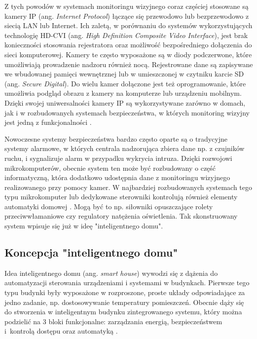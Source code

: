 \documentclass[a4paper,11pt,twoside]{article}
\begin{document}
Z tych powodów w systemach monitoringu wizyjnego coraz częściej stosowane są kamery IP (ang. \textit{Internet Protocol}) łączące się przewodowo lub bezprzewodowo z siecią LAN lub Internet. Ich zaletą, w porównaniu do systemów wykorzystujących technologię HD-CVI (ang. \textit{High Definition Composite Video Interface}), jest brak konieczności stosowania rejestratora oraz możliwość bezpośredniego dołączenia do sieci komputerowej. Kamery te często wyposażone są w diody podczerwone, które umożliwiają prowadzenie nadzoru również nocą. Rejestrowane dane są zapisywane we wbudowanej pamięci wewnętrznej lub w umieszczonej w czytniku karcie SD (ang. \textit{Secure Digital}). Do wielu kamer dołączone jest też oprogramowanie, które umożliwia podgląd obrazu z kamery na komputerze lub urządzeniu mobilnym. Dzięki swojej uniwersalności kamery IP są wykorzystywane zarówno w domach, jak i w rozbudowanych systemach bezpieczeństwa, w których monitoring wizyjny jest jedną z funkcjonalności \cite{komputer_świat}\cite{kamery-ip}.

Nowoczesne systemy bezpieczeństwa bardzo często oparte są o tradycyjne systemy alarmowe, w których centrala nadzorująca zbiera dane np. z czujników ruchu, i sygnalizuje alarm w przypadku wykrycia intruza. Dzięki rozwojowi mikrokomputerów, obecnie system ten może być rozbudowany o część informatyczną, która dodatkowo udostępnia dane z monitoringu wizyjnego realizowanego przy pomocy kamer. W najbardziej rozbudowanych systemach tego typu mikrokomputer lub dedykowane sterowniki kontrolują również elementy automatyki domowej \cite{monitoring}. Mogą być to np. siłowniki opuszczające rolety przeciwwłamaniowe czy regulatory natężenia oświetlenia. Tak skonstruowany system wpisuje się już w ideę "inteligentnego domu".

\subsection{Koncepcja "inteligentnego domu"}
Idea inteligentnego domu (ang. \textit{smart house}) wywodzi się z dążenia do automatyzacji sterowania urządzeniami i systemami w budynkach. Pierwsze tego typu budynki były wyposażone w rozproszone, proste układy odpowiadające za jedno zadanie, np. dostosowywanie temperatury pomieszczeń. Obecnie dąży się do stworzenia w inteligentnym budynku zintegrowanego systemu, który można podzielić na 3 bloki funkcjonalne: zarządzania energią, bezpieczeństwem i~kontrolą dostępu oraz automatyką \cite{inteligentny_dom}.
\end{document}
